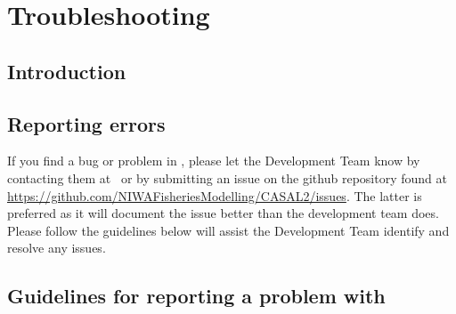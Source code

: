 \section{Troubleshooting\label{sec:trouble-shooting}}

\subsection{Introduction}

\subsection{Reporting errors\label{sec:reporting-errors}}

If you find a bug or problem in \CNAME , please let the Development Team know by contacting them at \email\ or by submitting an issue on the github repository found at \url{https://github.com/NIWAFisheriesModelling/CASAL2/issues}. The latter is preferred as it will document the issue better than the development team does. Please follow the guidelines below will assist the Development Team identify and resolve any issues.

\subsection{Guidelines for reporting a problem with \CNAME\label{sec:error-guidelines}}

